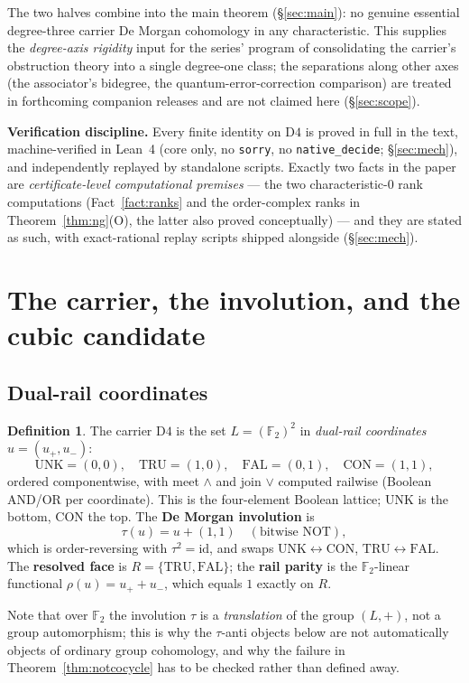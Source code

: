 \documentclass[11pt]{article}
\theoremstyle{definition}
\newtheorem{definition}[theorem]{Definition}
\theoremstyle{remark}
\newcommand{\F}{\mathbb{F}}
\newcommand{\UNK}{\mathrm{UNK}}
\newcommand{\TRU}{\mathrm{TRU}}
\newcommand{\FAL}{\mathrm{FAL}}
\newcommand{\CON}{\mathrm{CON}}
\newcommand{\Dfour}{\mathrm{D4}}
\begin{document}
The two halves combine into the main theorem (\S\ref{sec:main}): no genuine essential degree-three carrier De Morgan cohomology in any characteristic. This supplies the \emph{degree-axis rigidity} input for the series' program of consolidating the carrier's obstruction theory into a single degree-one class; the separations along other axes (the associator's bidegree, the quantum-error-correction comparison) are treated in forthcoming companion releases and are not claimed here (\S\ref{sec:scope}).

\textbf{Verification discipline.} Every finite identity on $\Dfour$ is proved in full in the text, machine-verified in Lean~4 (core only, no \texttt{sorry}, no \texttt{native\_decide}; \S\ref{sec:mech}), and independently replayed by standalone scripts. Exactly two facts in the paper are \emph{certificate-level computational premises} --- the two characteristic-$0$ rank computations (Fact~\ref{fact:ranks} and the order-complex ranks in Theorem~\ref{thm:ng}(O), the latter also proved conceptually) --- and they are stated as such, with exact-rational replay scripts shipped alongside (\S\ref{sec:mech}).

\section{The carrier, the involution, and the cubic candidate}

\subsection{Dual-rail coordinates}

\begin{definition}\label{def:carrier}
The carrier $\Dfour$ is the set $L=(\F_2)^2$ in \emph{dual-rail coordinates} $u=(u_+,u_-)$:
\[
\UNK=(0,0),\quad \TRU=(1,0),\quad \FAL=(0,1),\quad \CON=(1,1),
\]
ordered componentwise, with meet $\wedge$ and join $\vee$ computed railwise (Boolean AND/OR per coordinate). This is the four-element Boolean lattice; $\UNK$ is the bottom, $\CON$ the top. The \textbf{De Morgan involution} is
\[
\tau(u) = u+(1,1) \quad (\text{bitwise NOT}),
\]
which is order-reversing with $\tau^2=\mathrm{id}$, and swaps $\UNK\leftrightarrow\CON$, $\TRU\leftrightarrow\FAL$. The \textbf{resolved face} is $R=\{\TRU,\FAL\}$; the \textbf{rail parity} is the $\F_2$-linear functional $\rho(u)=u_++u_-$, which equals $1$ exactly on $R$.
\end{definition}

Note that over $\F_2$ the involution $\tau$ is a \emph{translation} of the group $(L,+)$, not a group automorphism; this is why the $\tau$-anti objects below are not automatically objects of ordinary group cohomology, and why the failure in Theorem~\ref{thm:notcocycle} has to be checked rather than defined away.
\end{document}
